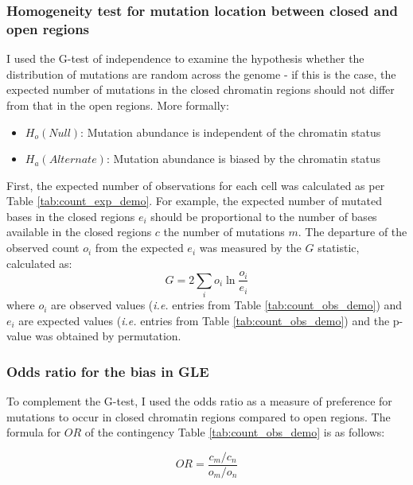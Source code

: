 

\subsubsection{Homogeneity test for mutation location between closed and open regions}
I used the G-test of independence \citep{McDonald2014GtestStatistics} to examine the hypothesis whether the distribution of mutations are random across the genome - if this is the case, the expected number of mutations in the closed chromatin regions should not differ from that in the open regions. More formally:

\begin{itemize}
    \item $H_o (Null)$: Mutation abundance is independent of the chromatin status
    \item $H_a (Alternate)$: Mutation abundance is biased by the chromatin status
\end{itemize}

First, the expected number of observations for each cell was calculated as per Table \ref{tab:count_exp_demo}. For example, the expected number of mutated bases in the closed regions $e_i$ should be proportional to the number of bases available in the closed regions $c$ the number of mutations $m$. The departure of the observed count $o_i$ from the expected $e_i$ was measured by the $G$ statistic, calculated as:
\begin{equation}
    G = 2 \underset{i}{\sum} o_{i} \ln \frac{o_{i}}{e_{i}}
    \label{eq:g}
\end{equation}
where $o_{i}$ are observed values (\textit{i.e.} entries from Table \ref{tab:count_obs_demo}) and $e_{i}$ are expected values (\textit{i.e.} entries from Table \ref{tab:count_obs_demo}) and the p-value was obtained by permutation.



\subsubsection{Odds ratio for the bias in GLE}
To complement the G-test, I used the odds ratio \citep[$OR$;][]{Hoppe2017OddsRatios} as a measure of preference for mutations to occur in closed chromatin regions compared to open regions. The formula for $OR$ of the contingency Table \ref{tab:count_obs_demo} is as follows:

\begin{equation}
    OR = \frac{c_m/c_n}{o_m/o_n}
    \label{eq:or}
\end{equation}

